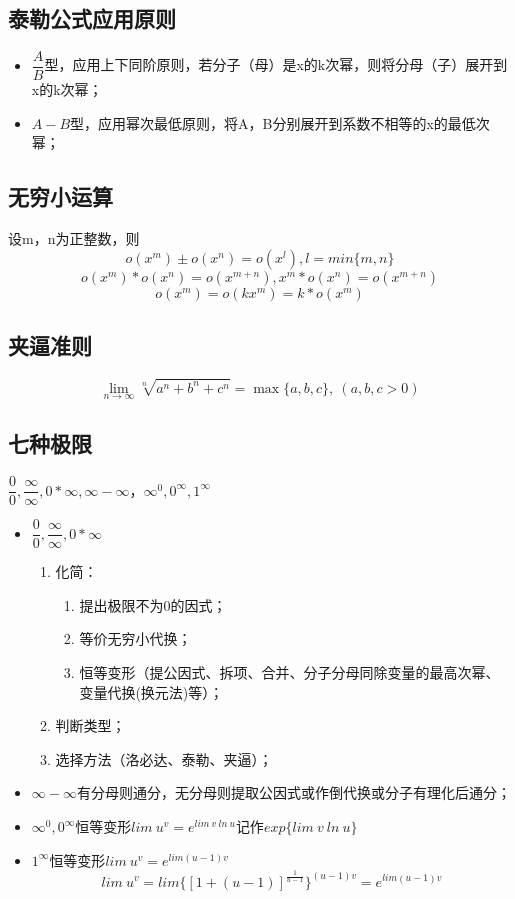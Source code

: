 \subsection{泰勒公式应用原则}
\begin{itemize}
    \item \(\dfrac{A}{B}\)型，应用上下同阶原则，若分子（母）是x的k次幂，则将分母（子）展开到x的k次幂；
    \item \(A - B\)型，应用幂次最低原则，将A，B分别展开到系数不相等的x的最低次幂；
\end{itemize}


\subsection{无穷小运算}
设m，n为正整数，则
\[o(x^m) \pm o(x^n) = o(x^l), l = min\{m, n\}\]
\[o(x^m) * o(x^n) = o(x^{m + n}), x^m * o(x^n) = o(x^{m + n})\]
\[o(x^m) = o(kx^m) = k*o(x^m)\]


\subsection{夹逼准则}

\[\lim_{n \to \infty}\sqrt[n]{a^n + b^n + c^n} = \max\{a, b, c\},\ (a, b, c > 0)\]

\subsection{七种极限}
\(\dfrac{0}{0}, \dfrac{\infty}{\infty}, 0 * \infty, \infty - \infty， \infty^0, 0^{\infty}, 1^{\infty}\)

\begin{itemize}
    \item \(\dfrac{0}{0}, \dfrac{\infty}{\infty}, 0 * \infty\)\begin{enumerate}
        \item 化简：\begin{enumerate}
            \item 提出极限不为0的因式；
            \item 等价无穷小代换；
            \item 恒等变形（提公因式、拆项、合并、分子分母同除变量的最高次幂、变量代换(换元法)等）；
        \end{enumerate}
        \item 判断类型；
        \item 选择方法（洛必达、泰勒、夹逼）；
    \end{enumerate}
    \item \(\infty - \infty\)有分母则通分，无分母则提取公因式或作倒代换或分子有理化后通分；
    \item \(\infty^0, 0^{\infty}\)恒等变形\(lim\ u^v = e^{lim\ v\ ln\ u} \text{记作}exp\{lim\ v\ ln\ u\}\)
    \item \(1^{\infty}\)恒等变形\(lim\ u^v = e^{lim(u - 1)v}\)
    \[lim\ u^v = lim\{[1 + (u - 1)]^{\frac{1}{u - 1}}\}^{(u - 1)v} = e^{lim(u - 1)v}\]
\end{itemize}





